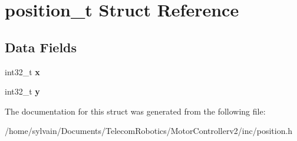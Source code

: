 \hypertarget{structposition__t}{}\section{position\+\_\+t Struct Reference}
\label{structposition__t}
\subsection*{Data Fields}
\begin{DoxyCompactItemize}
\item 
\hypertarget{structposition__t_ad8493ec8f5997bd4fee1d474117d59fc}{}\label{structposition__t_ad8493ec8f5997bd4fee1d474117d59fc} 
int32\+\_\+t {\bfseries x}
\item 
\hypertarget{structposition__t_a3fb64584e7cd979e3fa64cf189ddac87}{}\label{structposition__t_a3fb64584e7cd979e3fa64cf189ddac87} 
int32\+\_\+t {\bfseries y}
\end{DoxyCompactItemize}


The documentation for this struct was generated from the following file\+:\begin{DoxyCompactItemize}
\item 
/home/sylvain/\+Documents/\+Telecom\+Robotics/\+Motor\+Controllerv2/inc/position.\+h\end{DoxyCompactItemize}
